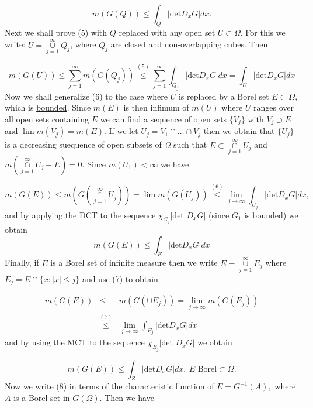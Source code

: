 \documentclass[12pt]{report}
\begin{document}
\begin{equation*}
m(G(Q)) \le \int_Q |\mbox{det} D_x G| dx.\tag{5}
\end{equation*}
Next we shall prove (5) with $Q$ replaced with any open set $U
\subset \Omega$.  For this we write: $U =
\overset{\infty}{\underset{j=1}{\cup}}Q_j$, where $Q_j$ are
closed and non-overlapping cubes.  Then

\begin{equation*}
m(G(U)) \le \sum^\infty_{j=1} m(G(Q_j)) \overset{(5)}{\le}
\sum^\infty_{j=1} \int_{Q_j}|\mbox{det} D_x G| dx = \int_U
|\mbox{det} D_xG| dx \tag{6}
\end{equation*}
Now we shall generalize (6) to the case where $U$ is replaced
by a Borel set $E \subset \Omega$, which is
\underline{bounded}.  Since $m(E) $ is then infimum of $m(U)$
where $U$ ranges over all open sets containing $E$ we can
find a sequence of open sets $\{V_j\}$ with $V_j \supset E$ and
$\lim m(V_j) = m(E)$.  If we let $U_j = V_1 \cap \dots \cap
V_j$ then we obtain that $\{U_j\}$ is a decreasing
suequence of open subsets of $\Omega$ such that $E \subset
\overset{\infty}{\underset{j=1}{\cap}} U_j$ and
$m(\overset{\infty}{\underset{j=1}{\cap}} U_j - E) = 0$.  Since
$m(U_1) < \infty$ we have

\[
m(G(E)) \le m(G( \overset{\infty}{\underset{j=1}{\cap}} U_j)) =
\lim m(G(U_j)) \overset{(6)}{\le} \lim_{j\to \infty} \int_{U_j}
|\mbox{det} D_x G| dx,
\]
and by applying the DCT to the sequence $\chi_{G_j} |$det
$D_xG|$ (since $G_1$ is bounded)  we obtain
\begin{equation*}
m(G(E)) \le \int_E |\mbox{det} D_x G| dx \tag{7}
\end{equation*}
Finally, if $E$ is a Borel set of infinite measure then we write $E
= \overset{\infty}{\underset{j=1}{\cup}} E_j$ where $E_j = E
\cap \{x: |x| \le j\}$ and use (7) to obtain

\begin{eqnarray*}
m(G(E)) &\le& m(G(\cup E_j)) = \lim_{j \to \infty} m(G (E_j))\\
&\overset{(7)}{\le}& \underset{j \to \infty}{\lim} \int_{E_j}
|\mbox{det} D_x G| dx
\end{eqnarray*}
and by using the MCT to the sequence $\chi_{E_j} |$det $D_x G|$
we obtain

\begin{equation*}
m(G(E)) \le \int_Z |\mbox{det} D_x G| dx,\  E \mbox{ Borel}
\subset \Omega.\tag{8}
\end{equation*}
Now we write (8) in terms of the characteristic
function of $E = G^{-1} (A),$ where $A$ is a Borel set in
$G(\Omega)$.  Then we have
\end{document}
